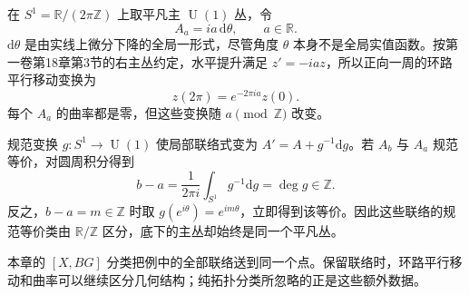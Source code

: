\begin{example}\label{g2:exm:circle-connections-same-bundle}
	在 \(S^1=\mathbb R/(2\pi\mathbb Z)\) 上取平凡主 \(\operatorname U(1)\) 丛，令
	\[
		A_a=i a\,\mathrm d\theta,\qquad a\in\mathbb R.
	\]
	\(\mathrm d\theta\) 是由实线上微分下降的全局一形式，尽管角度 \(\theta\) 本身不是全局实值函数。按第一卷第18章第3节的右主丛约定，水平提升满足 \(z'=-ia z\)，所以正向一周的环路平行移动变换为
	\[
		z(2\pi)=e^{-2\pi ia}z(0).
	\]
	每个 \(A_a\) 的曲率都是零，但这些变换随 \(a\pmod{\mathbb Z}\) 改变。

	规范变换 \(g:S^1\to\operatorname U(1)\) 使局部联络式变为 \(A'=A+g^{-1}\mathrm dg\)。若 \(A_b\) 与 \(A_a\) 规范等价，对圆周积分得到
	\[
		b-a=\frac1{2\pi i}\int_{S^1}g^{-1}\mathrm dg=\deg g\in\mathbb Z.
	\]
	反之，\(b-a=m\in\mathbb Z\) 时取 \(g(e^{i\theta})=e^{im\theta}\)，立即得到该等价。因此这些联络的规范等价类由 \(\mathbb R/\mathbb Z\) 区分，底下的主丛却始终是同一个平凡丛。
\end{example}

本章的 \([X,BG]\) 分类把例中的全部联络送到同一个点。保留联络时，环路平行移动和曲率可以继续区分几何结构；纯拓扑分类所忽略的正是这些额外数据。
